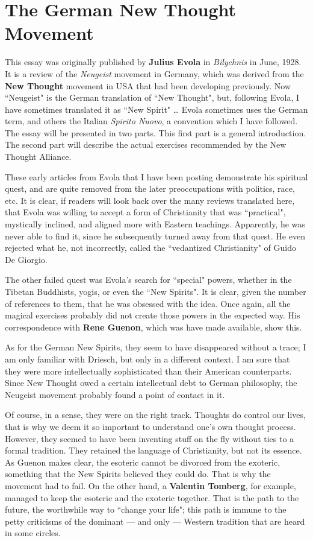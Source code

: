 \section{The German New Thought Movement}

\begin{quotationx}
This essay was originally published by \textbf{Julius Evola} in \emph{Bilychnis} in June, 1928. It is a review of the \emph{Neugeist} movement in Germany, which was derived from the \textbf{New Thought} movement in USA that had been developing previously. Now ``Neugeist" is the German translation of ``New Thought", but, following Evola, I have sometimes translated it as ``New Spirit" … Evola sometimes uses the German term, and others the Italian \emph{Spirito Nuovo}, a convention which I have followed. The essay will be presented in two parts. This first part is a general introduction. The second part will describe the actual exercises recommended by the New Thought Alliance.

These early articles from Evola that I have been posting demonstrate his spiritual quest, and are quite removed from the later preoccupations with politics, race, etc. It is clear, if readers will look back over the many reviews translated here, that Evola was willing to accept a form of Christianity that was ``practical", mystically inclined, and aligned more with Eastern teachings. Apparently, he was never able to find it, since he subsequently turned away from that quest. He even rejected what he, not incorrectly, called the ``vedantized Christianity" of Guido De Giorgio.

The other failed quest was Evola's search for ``special" powers, whether in the Tibetan Buddhists, yogis, or even the ``New Spirits". It is clear, given the number of references to them, that he was obsessed with the idea. Once again, all the magical exercises probably did not create those powers in the expected way. His correspondence with \textbf{Rene Guenon}, which was have made available, show this.

As for the German New Spirits, they seem to have disappeared without a trace; I am only familiar with Driesch, but only in a different context. I am sure that they were more intellectually sophisticated than their American counterparts. Since New Thought owed a certain intellectual debt to German philosophy, the Neugeist movement probably found a point of contact in it.

Of course, in a sense, they were on the right track. Thoughts do control our lives, that is why we deem it so important to understand one's own thought process. However, they seemed to have been inventing stuff on the fly without ties to a formal tradition. They retained the language of Christianity, but not its essence. As Guenon makes clear, the esoteric cannot be divorced from the exoteric, something that the New Spirits believed they could do. That is why the movement had to fail. On the other hand, a \textbf{Valentin Tomberg}, for example, managed to keep the esoteric and the exoteric together. That is the path to the future, the worthwhile way to ``change your life"; this path is immune to the petty criticisms of the dominant — and only — Western tradition that are heard in some circles. 


\end{quotationx}

